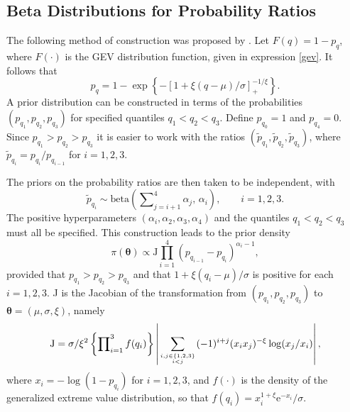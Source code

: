 \documentclass[11pt,a4paper]{article}
\newcommand{\bs}{\boldsymbol}
\newcommand{\sfrac}[2]{\genfrac{}{}{0pt}{}{#1}{#2}}
\begin{document}
\subsection{Beta Distributions for Probability Ratios}
\label{spriorbeta}

The following method of construction was proposed by \citet{crow92}.
Let  $F(q) = 1-p_q$, where $F(\cdot)$ is the GEV distribution function, given in expression \eqref{gev}. It follows that
\begin{equation*}
p_q = 1 - \exp \left\{ - \left[ 1+ \xi \left( q-\mu \right) /\sigma  \right]_{+}^{-1/\xi} \right\}.
\end{equation*}
A prior distribution can be constructed in terms of the probabilities $(p_{q_1},p_{q_2},p_{q_3})$ for specified quantiles $q_1 < q_2 < q_3$.
Define $p_{q_0} = 1$ and $p_{q_4} = 0$.
Since $p_{q_1} > p_{q_2} > p_{q_3}$ it is easier to work with the ratios $(\tilde{p}_{q_1},\tilde{p}_{q_2},\tilde{p}_{q_3})$, where $\tilde{p}_{q_i} = p_{q_i}/p_{q_{i-1}}$ for $i=1,2,3$.

The priors on the probability ratios are then taken to be independent, with
\begin{equation*}
\tilde{p}_{q_i} \sim \text{beta}\left(\sum\nolimits_{j=i+1}^4 \alpha_j,\,\alpha_i\right), \qquad i=1,2,3.
\end{equation*}
The positive hyperparameters $(\alpha_i,\alpha_2,\alpha_3,\alpha_4)$ and the quantiles $q_1 < q_2 < q_3$ must all be specified.
This construction leads to the prior density
\begin{equation}
\pi(\bs{\theta}) \propto \text{J}
\prod_{i=1}^{4} (p_{q_{i-1}} - p_{q_i})^{\alpha_i - 1},
\label{priorbeta}
\end{equation}
provided that $p_{q_1} > p_{q_2} > p_{q_3}$ and that $1+ \xi( q_i-\mu)/\sigma$ is positive for each $i=1,2,3$. 
J is the Jacobian of the transformation from $(p_{q_1},p_{q_2},p_{q_3})$ to $\bs{\theta}=(\mu,\sigma,\xi)$, namely
\begin{equation*}
\text{J} = \sigma/\xi^2  \left\{ \prod\nolimits_{i=1}^3 f(q_i) \right\} \left| \sum_{\sfrac{i,j \in \{1,2,3\}}{i < j}} (-1)^{i+j} (x_ix_j)^{-\xi} \log (x_j/x_i) \right|,
\end{equation*}
where $x_i = -\log(1 - p_{q_i})$ for $i=1,2,3$, and $f(\cdot)$ is the density of the generalized extreme value distribution, so that $f(q_i) = x_i^{1+\xi}\text{e}^{-x_i}/\sigma$.
\end{document}
